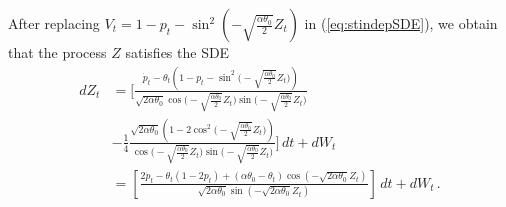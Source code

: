 \documentclass[11pt]{article}
\theoremstyle{definition}
\begin{document}
After replacing $V_t = 1 - p_t - \sin^2 \left(- \sqrt{ \frac{ \alpha \theta_0}{2} } Z_t \right) $ in (\ref{eq:stindepSDE}), we obtain that the  process $Z$ satisfies the SDE
\begin{align}
dZ_t & = \Bigg[ \frac{ \dot{p}_t  - \theta_t  \left(1 - p_t - \sin^2 \Big(- \sqrt{ \frac{ \alpha \theta_0}{2} } Z_t \Big) \right) }{\sqrt{2 \alpha \theta_0} \cos\Big(- \sqrt{ \frac{ \alpha \theta_0}{2} } Z_t \Big)  \sin\Big(- \sqrt{ \frac{ \alpha \theta_0}{2} } Z_t \Big)}  \nonumber \\
&  - \frac{1}{4}  \frac{\sqrt{2 \alpha \theta_0} \left(1 - 2 \cos^2 \Big(- \sqrt{ \frac{ \alpha \theta_0}{2} } Z_t \Big) \right) }{\cos\Big(- \sqrt{ \frac{ \alpha \theta_0}{2} } Z_t \Big)  \sin\Big(- \sqrt{ \frac{ \alpha \theta_0}{2} } Z_t \Big)} \Bigg] \,dt + dW_t \nonumber \\
&  = \left[  \frac{  2  \dot{p}_t - \theta_t (1 - 2 p_t)  + (\alpha \theta_0 - \theta_t) \cos(- \sqrt{2 \alpha \theta_0 } Z_t) }{\sqrt{2 \alpha \theta_0} \sin{(- \sqrt{2 \alpha \theta_0} Z_t)}}  \right] \,dt + dW_t \,.  \label{eq:stindepSDE2}
\end{align}
\end{document}
